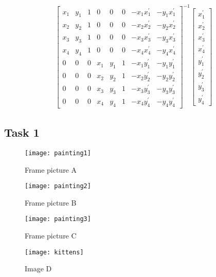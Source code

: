 \documentclass[11pt]{article}
\begin{document}
\begin{align*}
\begin{bmatrix}
x_{1} & y_{1} & 1  & 0 & 0 & 0 & -x_{1}x_1^{'} & -y_{1}x_1^{'}\\ 
x_{2} & y_{2} & 1  & 0 & 0 & 0 & -x_{2}x_2^{'} & -y_{2}x_2^{'}\\ 
x_{3} & y_{3} & 1  & 0 & 0 & 0 & -x_{3}x_3^{'} & -y_{3}x_3^{'}\\ 
x_{4} & y_{4} & 1  & 0 & 0 & 0 & -x_{4}x_4^{'} & -y_{4}x_4^{'}\\ 
0 & 0 & 0 & x_{1} & y_{1} & 1 & -x_{1}y_1^{'} & -y_{1}y_1^{'}\\ 
0 & 0 & 0 & x_{2} & y_{2} & 1 & -x_{2}y_2^{'} & -y_{2}y_2^{'}\\ 
0 & 0 & 0 & x_{3} & y_{3} & 1 & -x_{3}y_3^{'} & -y_{3}y_3^{'}\\ 
0 & 0 & 0 & x_{4} & y_{4} & 1 & -x_{4}y_4^{'} & -y_{4}y_4^{'}
\end{bmatrix}^{-1}
\begin{bmatrix}
x_1^{'}\\ x_2^{'}\\ x_3^{'} \\ x_4^{'} \\ y_1^{'} \\ y_2^{'} \\ y_3^{'} \\ y_4^{'}
\end{bmatrix}
\end{align*}


\subsection*{Task 1}

\begin{figure}[H]
\centering
\texttt{[image: painting1]}
\caption{Frame picture A}
\label{}
\end{figure}

\begin{figure}[H]
\centering
\texttt{[image: painting2]}
\caption{Frame picture B}
\label{}
\end{figure}

\begin{figure}[H]
\centering
\texttt{[image: painting3]}
\caption{Frame picture C}
\label{}
\end{figure}

\begin{figure}[H]
\centering
\texttt{[image: kittens]}
\caption{Image D}
\label{}
\end{figure}
\end{document}

